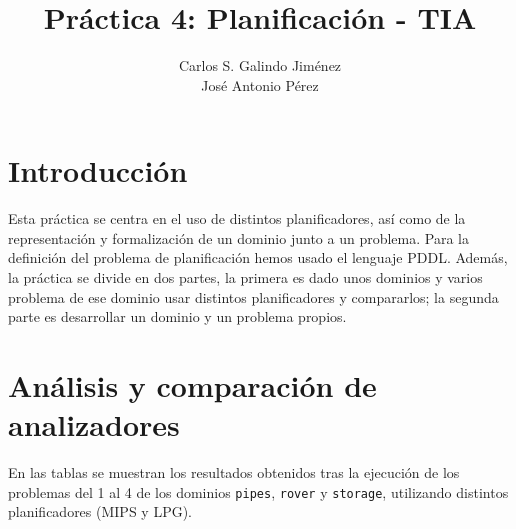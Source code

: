 \documentclass[a4paper]{article}
\title{Práctica 4: Planificación - TIA}
\author{Carlos S. Galindo Jiménez \\ José Antonio Pérez}
\begin{document}
\maketitle

\section{Introducción}
Esta práctica se centra en el uso de distintos planificadores, así como de la representación y formalización de un dominio junto a un problema. Para la definición del problema de planificación hemos usado el lenguaje PDDL. Además, la práctica se divide en dos partes, la primera es dado unos dominios y varios problema de ese dominio usar distintos planificadores y compararlos; la segunda parte es desarrollar un dominio y un problema propios. 
\section{Análisis y comparación de analizadores}
En las tablas se muestran los resultados obtenidos tras la ejecución de los problemas del 1 al 4 de los dominios \texttt{pipes}, \texttt{rover} y \texttt{storage}, utilizando distintos planificadores (MIPS y LPG).
\end{document}
